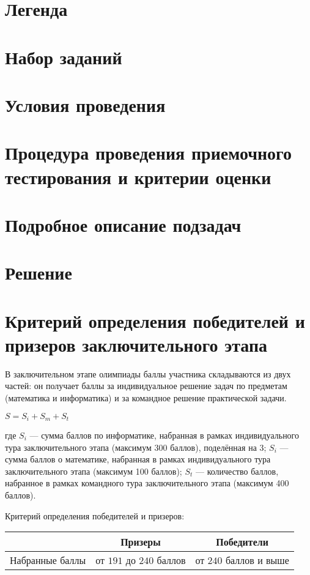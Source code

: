 \section{Легенда}


\section{Набор заданий}


\section{Условия проведения}


\section{Процедура проведения приемочного тестирования и критерии оценки}


\section{Подробное описание подзадач}


\section{Решение}


\section{Критерий определения победителей и призеров
заключительного этапа}

В заключительном этапе олимпиады баллы участника складываются
из двух частей: он получает баллы за индивидуальное решение задач по
предметам (математика и информатика) и за командное решение
практической задачи.

\begin{center}
    $S = S_i + S_m + S_t$
\end{center}

где $S_i$ --- сумма баллов по информатике, набранная в рамках индивидуального
тура заключительного этапа (максимум 300 баллов), поделённая на 3; $S_i$ ---
сумма баллов о математике, набранная в рамках индивидуального тура
заключительного этапа (максимум 100 баллов); $S_t$ --- количество баллов,
набранное в рамках командного тура заключительного этапа (максимум
400 баллов).

Критерий определения победителей и призеров:

\begin{center}
\begin{tabular}{ |c|c|c| }
 \hline
  & \textbf{Призеры} & \textbf{Победители} \\
 \hline
 Набранные баллы & от $191$ до $240$ баллов & от $240$ баллов и выше \\
 \hline
\end{tabular}
\end{center}
